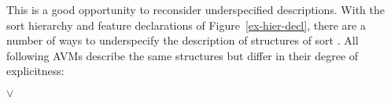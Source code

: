 \documentclass[output=paper
 	        ,biblatex
                ,babelshorthands
                ,newtxmath
                ,draftmode
                ,colorlinks, citecolor=brown
]{langscibook}
\begin{document}
This is a good opportunity to reconsider underspecified descriptions.
With the sort hierarchy and feature declarations of Figure~\ref{ex-hier-decl},
there are a number of ways to underspecify the description of structures
of sort . All following AVMs describe the same structures
but differ in their degree of explicitness:

         
\eal
\label{ex-desc-n}
\ex\label{ex-n-full} 
\ex\label{ex-n-n}
\ex\label{ex-n-o}
\ex\label{ex-o-o} 
\ex\label{ex-n-sfull} 
     $\lor$  
\zl
\end{document}
